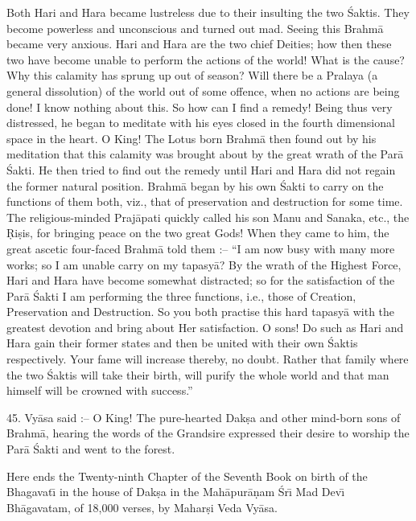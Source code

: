 Both Hari and Hara became lustreless due to their insulting the two \'Saktis. They become powerless and unconscious and turned out mad. Seeing this Brahm\=a became very anxious. Hari and Hara are the two chief Deities; how then these two have become unable to perform the actions of the world! What is the cause? Why this calamity has sprung up out of season? Will there be a Pralaya (a general dissolution) of the world out of some offence, when no actions are being done! I know nothing about this. So how can I find a remedy! Being thus very distressed, he began to meditate with his eyes closed in the fourth dimensional space in the heart. O King! The Lotus born Brahm\=a then found out by his meditation that this calamity was brought about by the great wrath of the Par\=a \'Sakti. He then tried to find out the remedy until Hari and Hara did not regain the former natural position. Brahm\=a began by his own \'Sakti to carry on the functions of them both, viz., that of preservation and destruction for some time. The religious-minded Praj\=apati quickly called his son Manu and Sanaka, etc., the \d{R}i\d{s}is, for bringing peace on the two great Gods! When they came to him, the great ascetic four-faced Brahm\=a told them :-- ``I am now busy with many more works; so I am unable carry on my tapasy\=a? By the wrath of the Highest Force, Hari and Hara have become somewhat distracted; so for the satisfaction of the Par\=a \'Sakti I am performing the three functions, i.e., those of Creation, Preservation and Destruction. So you both practise this hard tapasy\=a with the greatest devotion and bring about Her satisfaction. O sons! Do such as Hari and Hara gain their former states and then be united with their own \'Saktis respectively. Your fame will increase thereby, no doubt. Rather that family where the two \'Saktis will take their birth, will purify the whole world and that man himself will be crowned with success.''

45. Vy\=asa said :-- O King! The pure-hearted Dak\d{s}a and other mind-born sons of Brahm\=a, hearing the words of the Grandsire expressed their desire to worship the Par\=a \'Sakti and went to the forest.

Here ends the Twenty-ninth Chapter of the Seventh Book on birth of the Bhagavat\={\i} in the house of Dak\d{s}a in the Mah\=apur\=a\d{n}am \'Sr\={\i} Mad Dev\={\i} Bh\=agavatam, of 18,000 verses, by Mahar\d{s}i Veda Vy\=asa.



